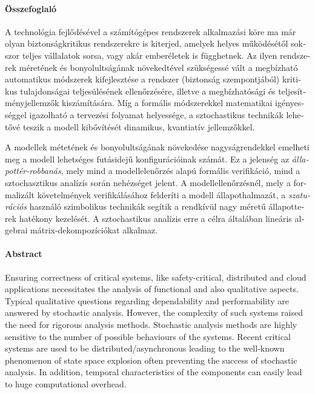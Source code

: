 \begin{otherlanguage}{magyar}

  \thispagestyle{plain}
  \paragraph*{Összefoglaló}

  A technológia fejlődésével a számítógépes rendszerek
  alkalmazási köre ma már olyan biztonságkritikus rendszerekre is
  kiterjed, amelyek helyes működésétől sokszor teljes vállalatok
  sorsa, vagy akár emberéletek is függhetnek. Az ilyen rendszerek
  méretének és bonyolultságának növekedtével szükségessé vált a
  megbízható automatikus módszerek kifejlesztése a rendszer (biztonság
  szempontjából) kritikus tulajdonságai teljesülésének ellenőrzésére,
  illetve a megbízhatósági és teljesítményjellemzők kiszámítására. Míg
  a formális módszerekkel matematikai igényességgel igazolható a
  tervezési folyamat helyessége, a sztochastikus technikák lehetővé
  teszik a modell kibővítését dinamikus, kvantiatív jellemzőkkel.

  A modellek métetének és bonyolultságának növekedése nagyságrendekkel
  emelheti meg a modell lehetséges futásidejű konfigurációinak
  számát. Ez a jelenség az \emph{állapottér-robbanás}, mely mind a
  modellelenőrzés alapú formális verifikáció, mind a sztochasztikus
  analízís során nehézséget jelent. A modellellenőrzésnél, mely a
  formalizált követelmények verifikálásához felderíti a modell
  állapothalmazát, a \emph{szaturációs} használó szimbolikus technikák
  segítik a rendkívül nagy méretű állapotterek hatékony kezelését. A
  sztochastikus analízis erre a célra általában lineáris algebrai
  mátrix-dekompozíciókat alkalmaz.

\end{otherlanguage}

\cleardoublepage

\thispagestyle{plain}
\paragraph*{Abstract}

Ensuring correctness of critical systems, like safety-critical,
distributed and cloud applications necessitates the analysis of
functional and also qualitative aspects. Typical qualitative questions
regarding dependability and performability are answered by stochastic
analysis. However, the complexity of such systems raised the need for
rigorous analysis methods.  Stochastic analysis methods are highly
sensitive to the number of possible behaviours of the systems. Recent
critical systems are used to be distributed/asynchronous leading to
the well-known phenomenon of state space explosion often preventing
the success of stochastic analysis. In addition, temporal
characteristics of the components can easily lead to huge
computational overhead.

